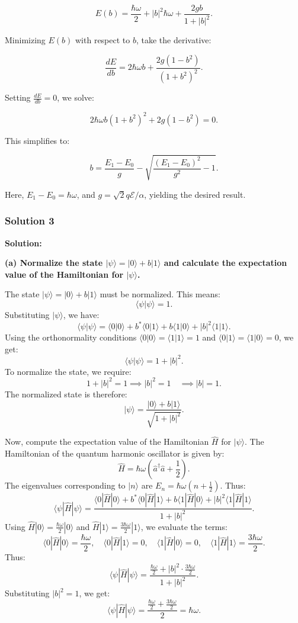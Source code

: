 \documentclass{article}
\begin{document}
\[
E(b) = \frac{\hbar \omega}{2} + |b|^2 \hbar \omega + \frac{2 g b}{1 + |b|^2}.
\]

Minimizing \(E(b)\) with respect to \(b\), take the derivative:

\[
\frac{dE}{db} = 2 \hbar \omega b + \frac{2g(1 - b^2)}{(1 + b^2)^2}.
\]

Setting \(\frac{dE}{db} = 0\), we solve:

\[
2 \hbar \omega b (1 + b^2)^2 + 2g(1 - b^2) = 0.
\]

This simplifies to:

\[
b = \frac{E_1 - E_0}{g} - \sqrt{\frac{(E_1 - E_0)^2}{g^2} - 1}.
\]

Here, \(E_1 - E_0 = \hbar \omega\), and \(g = \sqrt{2} q \mathcal{E}/\alpha\), yielding the desired result.

\subsubsection{Solution 3}

\textbf{Solution:}

\textbf{(a) Normalize the state \(|\psi\rangle = |0\rangle + b |1\rangle\) and calculate the expectation value of the Hamiltonian for \(|\psi\rangle\).}

The state \(|\psi\rangle = |0\rangle + b |1\rangle\) must be normalized. This means:
\[
\langle \psi | \psi \rangle = 1.
\]
Substituting \(|\psi\rangle\), we have:
\[
\langle \psi | \psi \rangle = \langle 0 | 0 \rangle + b^* \langle 0 | 1 \rangle + b \langle 1 | 0 \rangle + |b|^2 \langle 1 | 1 \rangle.
\]
Using the orthonormality conditions \(\langle 0 | 0 \rangle = \langle 1 | 1 \rangle = 1\) and \(\langle 0 | 1 \rangle = \langle 1 | 0 \rangle = 0\), we get:
\[
\langle \psi | \psi \rangle = 1 + |b|^2.
\]
To normalize the state, we require:
\[
1 + |b|^2 = 1 \implies |b|^2 = 1 \quad \implies |b| = 1.
\]
The normalized state is therefore:
\[
|\psi\rangle = \frac{|0\rangle + b |1\rangle}{\sqrt{1 + |b|^2}}.
\]

Now, compute the expectation value of the Hamiltonian \(\hat{H}\) for \(|\psi\rangle\). The Hamiltonian of the quantum harmonic oscillator is given by:
\[
\hat{H} = \hbar\omega \left(\hat{a}^\dagger \hat{a} + \frac{1}{2}\right).
\]
The eigenvalues corresponding to \(|n\rangle\) are \(E_n = \hbar\omega\left(n + \frac{1}{2}\right)\). Thus:
\[
\langle \psi | \hat{H} | \psi \rangle = \frac{\langle 0 | \hat{H} | 0 \rangle + b^* \langle 0 | \hat{H} | 1 \rangle + b \langle 1 | \hat{H} | 0 \rangle + |b|^2 \langle 1 | \hat{H} | 1 \rangle}{1 + |b|^2}.
\]
Using \(\hat{H} |0\rangle = \frac{\hbar\omega}{2} |0\rangle\) and \(\hat{H} |1\rangle = \frac{3\hbar\omega}{2} |1\rangle\), we evaluate the terms:
\[
\langle 0 | \hat{H} | 0 \rangle = \frac{\hbar\omega}{2}, \quad \langle 0 | \hat{H} | 1 \rangle = 0, \quad \langle 1 | \hat{H} | 0 \rangle = 0, \quad \langle 1 | \hat{H} | 1 \rangle = \frac{3\hbar\omega}{2}.
\]
Thus:
\[
\langle \psi | \hat{H} | \psi \rangle = \frac{\frac{\hbar\omega}{2} + |b|^2 \cdot \frac{3\hbar\omega}{2}}{1 + |b|^2}.
\]
Substituting \(|b|^2 = 1\), we get:
\[
\langle \psi | \hat{H} | \psi \rangle = \frac{\frac{\hbar\omega}{2} + \frac{3\hbar\omega}{2}}{2} = \hbar\omega.
\]
\end{document}
